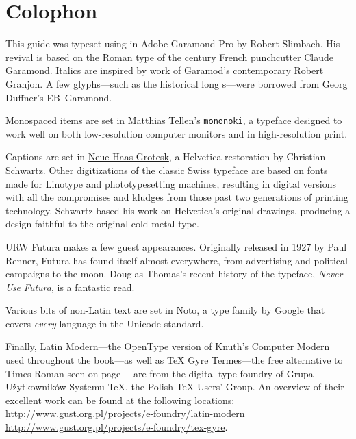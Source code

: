 \backmatter


{\raggedright
\renewcommand\makeenmark{\theenmark.\enspace}
\theendnotes
}

{\let\cleardoublepage\clearpage \chapter{Colophon}}

This guide was typeset using \LuaLaTeX{} in Adobe Garamond Pro by
Robert Slimbach.
His revival is based on the Roman type of
the  century French
punchcutter Claude Garamond.
Italics are inspired by work of Garamod's contemporary Robert Granjon.
A few glyphs---such as the historical long s---were borrowed from
Georg Duffner's EB~Garamond.

Monospaced items are set in Matthias Tellen's
\href{https://madmalik.github.io/mononoki/}{\texttt{mononoki}},
a typeface designed to work well on both low-resolution computer monitors
and in high-resolution print.

Captions are set in
\href{http://www.fontbureau.com/NHG/}{\textsf{\small Neue Haas Grotesk}},
a Helvetica restoration by Christian Schwartz.
Other digitizations of the classic Swiss typeface are based on fonts made for
Linotype and phototypesetting machines,
resulting in digital versions with all the compromises and kludges from those
past two generations of printing technology.
Schwartz based his work on Helvetica's original drawings,
producing a design faithful to the original cold metal type.

{URW Futura}
makes a few guest appearances.
Originally released in 1927 by Paul Renner,
Futura has found itself almost everywhere,
from advertising and political campaigns to the moon.
Douglas Thomas's recent history of the typeface,
\textit{Never Use Futura}, is a fantastic read.

Various bits of non-Latin text are set in
{Noto},
a type family by Google that covers \emph{every} language
in the Unicode standard.

Finally,
{\lm Latin Modern}---the OpenType version of Knuth's Computer Modern used throughout
the book---as well
as {\TeX{} Gyre Termes}---the
free alternative to Times Roman seen on page \pageref{typography}---are from
the digital type foundry of Grupa Użytkowników Systemu \TeX{},
the Polish \TeX{} Users' Group.
An overview of their excellent work can be found at the following locations:\\
\url{http://www.gust.org.pl/projects/e-foundry/latin-modern} \\
\url{http://www.gust.org.pl/projects/e-foundry/tex-gyre}.
